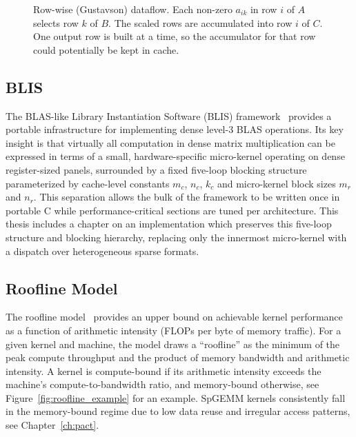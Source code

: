 \begin{figure}[t]
\centering
{}
\caption{Row-wise (Gustavson) dataflow. Each non-zero $a_{ik}$ in row $i$ of $A$ selects row $k$ of $B$. The scaled rows are accumulated into row $i$ of $C$. One output row is built at a time, so the accumulator for that row could potentially be kept in cache.}
\label{fig:df-row}
\end{figure}

\subsection{BLIS}
The BLAS-like Library Instantiation Software (BLIS) framework~\cite{blis} provides a
portable infrastructure for implementing dense level-3 BLAS operations. Its key insight
is that virtually all computation in dense matrix multiplication can be expressed in
terms of a small, hardware-specific micro-kernel operating on dense register-sized
panels, surrounded by a fixed five-loop blocking structure parameterized by cache-level
constants $m_c$, $n_c$, $k_c$ and micro-kernel block sizes $m_r$ and $n_r$. This
separation allows the bulk of the framework to be written once in portable C while
performance-critical sections are tuned per architecture. This thesis includes a chapter on an
implementation which preserves this five-loop structure and blocking hierarchy, replacing only the innermost
micro-kernel with a dispatch over heterogeneous sparse formats.

\subsection{Roofline Model}
The roofline model~\cite{roofline} provides an upper bound on achievable kernel
performance as a function of arithmetic intensity (FLOPs per byte of memory traffic).
For a given kernel and machine, the model draws a ``roofline'' as the minimum of the
peak compute throughput and the product of memory bandwidth and arithmetic intensity. A
kernel is compute-bound if its arithmetic intensity exceeds the machine's
compute-to-bandwidth ratio, and memory-bound otherwise, see Figure~\ref{fig:roofline_example} for an example. SpGEMM kernels consistently
fall in the memory-bound regime due to low data reuse and irregular access patterns, see Chapter~\ref{ch:pact}.


